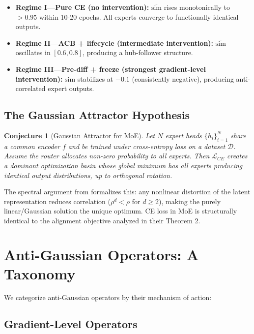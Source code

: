 \documentclass[twoside]{article}
\newtheorem{conjecture}{Conjecture}
\theoremstyle{definition}
\begin{document}
\begin{itemize}
    \item \textbf{Regime I---Pure CE (no intervention):} $\overline{\text{sim}}$ rises monotonically to $>0.95$ within 10-20 epochs. All experts converge to functionally identical outputs.

    \item \textbf{Regime II---ACB + lifecycle (intermediate intervention):} $\overline{\text{sim}}$ oscillates in $[0.6, 0.8]$, producing a hub-follower structure.

    \item \textbf{Regime III---Pre-diff + freeze (strongest gradient-level intervention):} $\overline{\text{sim}}$ stabilizes at $-0.1$ (consistently negative), producing anti-correlated expert outputs.
\end{itemize}

\subsection{The Gaussian Attractor Hypothesis}

\begin{conjecture}[Gaussian Attractor for MoE]
Let $N$ expert heads $\{h_i\}_{i=1}^{N}$ share a common encoder $f$ and be trained under cross-entropy loss on a dataset $\mathcal{D}$. Assume the router allocates non-zero probability to all experts. Then $\mathcal{L}_{CE}$ creates a dominant optimization basin whose global minimum has all experts producing identical output distributions, up to orthogonal rotation.
\end{conjecture}

The spectral argument from \cite{klindt2026} formalizes this: any nonlinear distortion of the latent representation reduces correlation ($\rho^d < \rho$ for $d \geq 2$), making the purely linear/Gaussian solution the unique optimum. CE loss in MoE is structurally identical to the alignment objective analyzed in their Theorem 2.

\section{Anti-Gaussian Operators: A Taxonomy}

We categorize anti-Gaussian operators by their mechanism of action:

\subsection{Gradient-Level Operators}
\end{document}
